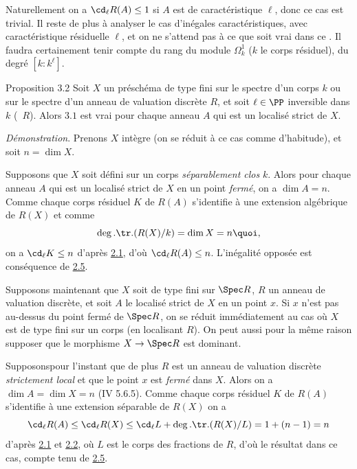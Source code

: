 \documentclass[10pt]{../fichiers-configuration-latex/smfart}
\begin{document}
Naturellement on a $\cd_{\ell}R(A)\leq 1$ si $A$ est de
caractéristique $\ell$, donc ce cas est trivial. Il reste de plus à
analyser le cas d'inégales caractéristiques, avec caractéristique
résiduelle $\ell$, et on ne s'attend pas à ce que  soit vrai dans
ce . Il faudra certainement tenir compte du rang du module
$\Omega^1_k$ ($k$ le corps résiduel), \ie du degré $[k:k^{\ell}]$. %

\begin{enonce*}{Proposition 3.2}
Soit $X$ un préschéma de type fini sur le spectre d'un corps $k$ ou
sur le spectre d'un anneau de valuation discrète $R$, et soit $\ell\in
\PP$ inversible dans $k$ (\resp~$R$). Alors $3.1$
est vrai pour chaque anneau $A$ qui est un localisé strict de $X$.
\end{enonce*}

\emph{Démonstration}. Prenons $X$ intègre (on se réduit à ce cas comme
d'habitude), et soit $n=\dim X$.

Supposons que $X$ soit défini sur un corps \emph{séparablement clos}
$k$. Alors pour chaque anneau $A$ qui est un localisé strict de $X$ en
un point \emph{fermé}, on a $\dim A=n$. Comme chaque corps résiduel
$K$ de $R(A)$ s'identifie à une extension algébrique de $R(X)$ et
comme
$$
\deg.\tr.(R(X)/k)=\dim X=n{\quoi},
$$
on a $\cd_{\ell}K\leq n$ d'après \hyperref[X.thm2.1]{2.1}, d'où $\cd_{\ell}R(A)\leq
n$. L'inégalité opposée est conséquence de \hyperref[X.cor2.5]{2.5}.

Supposons maintenant que $X$ soit de type fini sur $\Spec R$, $R$ un
anneau de valuation discrète, et soit $A$ le localisé strict de $X$ en
un point $x$. Si $x$ n'est pas au-dessus du point fermé de $\Spec R$,
on se réduit immédiatement au cas où $X$ est de type fini sur un corps
(en localisant $R$). On peut aussi pour la même raison supposer que le
morphisme $X\rightarrow \Spec R$ est dominant.

Supposons\pageoriginale pour l'instant que de plus $R$ est un anneau
de valuation discrète \emph{strictement local} et que le point $x$ est
\emph{fermé} dans $X$. Alors on a $\dim A=\dim X=n$ (\EGA IV
5.6.5). Comme chaque corps résiduel $K$ de $R(A)$ s'identifie à une
extension séparable de $R(X)$ on a
$$
\cd_{\ell}R(A)\leq \cd_{\ell}R(X)\leq
\cd_{\ell}L+\deg.\tr.(R(X)/L)=1+(n-1)=n
$$
d'après \hyperref[X.thm2.1]{2.1} et \hyperref[X.thm2.2]{2.2}, où $L$ est le corps 
des fractions de $R$, d'où le
résultat dans ce cas, compte tenu de \hyperref[X.cor2.5]{2.5}.
\end{document}
